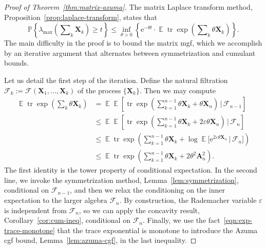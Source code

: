 \documentclass[11pt,letterpaper,twoside,reqno,draft]{amsart}
\theoremstyle{remark}
\numberwithin{equation}{section}
\numberwithin{thm}{section}
\begin{document}
\begin{proof}[Proof of Theorem~\ref{thm:matrix-azuma}]
The matrix Laplace transform method, Proposition~\ref{prop:laplace-transform}, states that
\begin{equation} \label{eqn:azuma-lt}
{\mathbb{P}\left\{ {{ \lambda_{\max}\left( \sum\nolimits_k {\bm{{X}}}_k \right) \geq t }} \right\}}
	\leq \inf_{\theta > 0} \left\{ {\mathrm{e}}^{-\theta t} \cdot
	{\operatorname{\mathbb{E}}} {\operatorname{tr}} \exp\left( \sum\nolimits_k \theta {\bm{{X}}}_k \right) \right\}.
\end{equation}
The main difficulty in the proof is to bound the matrix mgf, which we accomplish by an iterative argument that alternates between symmetrization and cumulant bounds.

Let us detail the first step of the iteration.  Define the natural filtration ${\mathscr{{F}}}_{k} := {\mathscr{{F}}}({\bm{{X}}}_1, \dots, {\bm{{X}}}_k)$ of the process $\{{\bm{{X}}}_k\}$.  Then we may compute
\begin{align*}
{\operatorname{\mathbb{E}}} {\operatorname{tr}} \exp\left( \sum\nolimits_k \theta {\bm{{X}}}_k \right)
	&= {\operatorname{\mathbb{E}}} {\operatorname{\mathbb{E}}}\left[ {\operatorname{tr}} \exp\left( \sum\nolimits_{k=1}^{n-1}
		\theta {\bm{{X}}}_k + \theta {\bm{{X}}}_n \right)
		\, \big| \, {\mathscr{{F}}}_{n-1} \right] \\
	&\leq {\operatorname{\mathbb{E}}} {\operatorname{\mathbb{E}}}\left[ {\operatorname{tr}} \exp\left(
	\sum\nolimits_{k=1}^{n-1} \theta{\bm{{X}}}_k
	+ 2{\varepsilon} \theta {\bm{{X}}}_n \right) \, \big| \, {\mathscr{{F}}}_{n} \right] \\
	&\leq {\operatorname{\mathbb{E}}} {\operatorname{tr}} \exp\left( \sum\nolimits_{k=1}^{n-1} \theta {\bm{{X}}}_k
	+ \log {\operatorname{\mathbb{E}}}\big[ {\mathrm{e}}^{2{\varepsilon} \theta {\bm{{X}}}_n} \, | \, {\mathscr{{F}}}_n \big] \right) \\
	&\leq {\operatorname{\mathbb{E}}} {\operatorname{tr}} \exp\left( \sum\nolimits_{k=1}^{n-1} \theta {\bm{{X}}}_k
	+ 2\theta^2 {\bm{{A}}}_n^2 \right).
\end{align*}
The first identity is the tower property of conditional expectation.  In the second line, we invoke the symmetrization method, Lemma~\ref{lem:symmetrization}, conditional on ${\mathscr{{F}}}_{n-1}$, and then we relax the conditioning on the inner expectation to the larger algebra ${\mathscr{{F}}}_n$.  By construction, the Rademacher variable ${\varepsilon}$ is independent from ${\mathscr{{F}}}_n$, so we can apply the concavity result, Corollary~\ref{cor:cum-ineq}, conditional on ${\mathscr{{F}}}_n$.  Finally, we use the fact~\eqref{eqn:exp-trace-monotone} that the trace exponential is monotone to introduce the Azuma cgf bound, Lemma~\ref{lem:azuma-cgf}, in the last inequality.


\end{proof}
\end{document}
